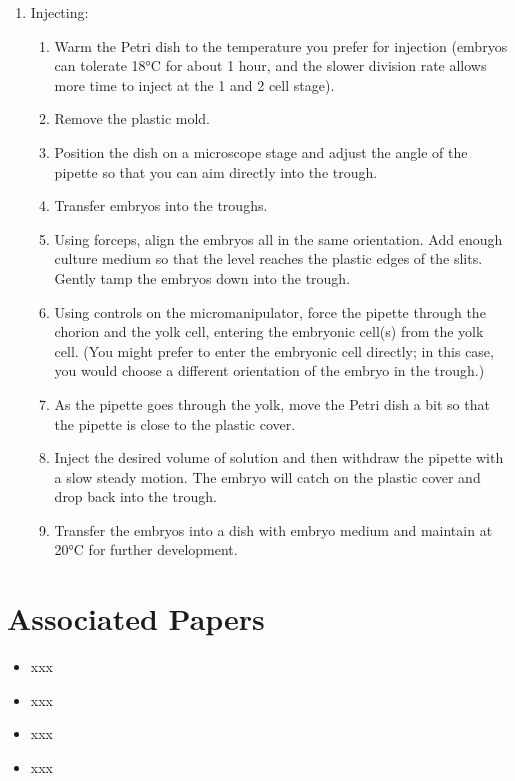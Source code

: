 \documentclass[
  letterpaper,
  DIV=11,
  numbers=noendperiod]{scrreprt}
\providecommand{\tightlist}{%
  \setlength{\itemsep}{0pt}\setlength{\parskip}{0pt}}\usepackage{longtable,booktabs,array}
\begin{document}
\begin{enumerate}
\def\labelenumi{\arabic{enumi}.}
\tightlist
\item
  Injecting:

  \begin{enumerate}
  \def\labelenumii{\arabic{enumii}.}
  \tightlist
  \item
    Warm the Petri dish to the temperature you prefer for injection
    (embryos can tolerate 18°C for about 1 hour, and the slower division
    rate allows more time to inject at the 1 and 2 cell stage).
  \item
    Remove the plastic mold.
  \item
    Position the dish on a microscope stage and adjust the angle of the
    pipette so that you can aim directly into the trough.
  \item
    Transfer embryos into the troughs.
  \item
    Using forceps, align the embryos all in the same orientation. Add
    enough culture medium so that the level reaches the plastic edges of
    the slits. Gently tamp the embryos down into the trough.
  \item
    Using controls on the micromanipulator, force the pipette through
    the chorion and the yolk cell, entering the embryonic cell(s) from
    the yolk cell. (You might prefer to enter the embryonic cell
    directly; in this case, you would choose a different orientation of
    the embryo in the trough.)
  \item
    As the pipette goes through the yolk, move the Petri dish a bit so
    that the pipette is close to the plastic cover.
  \item
    Inject the desired volume of solution and then withdraw the pipette
    with a slow steady motion. The embryo will catch on the plastic
    cover and drop back into the trough.
  \item
    Transfer the embryos into a dish with embryo medium and maintain at
    20°C for further development.
  \end{enumerate}
\end{enumerate}

\hypertarget{associated-papers-48}{%
\section{Associated Papers}\label{associated-papers-48}}

\begin{itemize}
\tightlist
\item
  xxx
\item
  xxx
\item
  xxx
\item
  xxx
\end{itemize}
\end{document}
